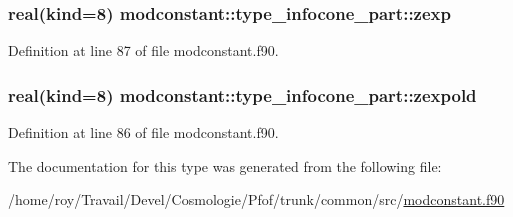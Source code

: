\subsubsection[{\texorpdfstring{zexp}{zexp}}]{\setlength{\rightskip}{0pt plus 5cm}real(kind=8) modconstant\+::type\+\_\+infocone\+\_\+part\+::zexp}\hypertarget{structmodconstant_1_1type__infocone__part_adef877fd872e2e87bfbb3973af57aae1}{}\label{structmodconstant_1_1type__infocone__part_adef877fd872e2e87bfbb3973af57aae1}


Definition at line 87 of file modconstant.\+f90.

\subsubsection[{\texorpdfstring{zexpold}{zexpold}}]{\setlength{\rightskip}{0pt plus 5cm}real(kind=8) modconstant\+::type\+\_\+infocone\+\_\+part\+::zexpold}\hypertarget{structmodconstant_1_1type__infocone__part_a6bc976cbbe5cd3d696c2c9d0b5095c70}{}\label{structmodconstant_1_1type__infocone__part_a6bc976cbbe5cd3d696c2c9d0b5095c70}


Definition at line 86 of file modconstant.\+f90.



The documentation for this type was generated from the following file\+:\begin{DoxyCompactItemize}
\item 
/home/roy/\+Travail/\+Devel/\+Cosmologie/\+Pfof/trunk/common/src/\hyperlink{modconstant_8f90}{modconstant.\+f90}\end{DoxyCompactItemize}
